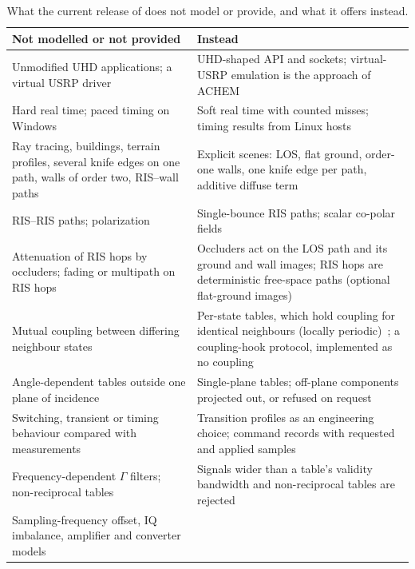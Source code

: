 \begin{table}[t]
\caption{What the current release of \sremu{} does not model or provide, and what it offers
instead.}
\label{tab:limitations}
\centering
\footnotesize
\setlength{\tabcolsep}{3pt}
\renewcommand{\arraystretch}{1.1}
\begin{tabular}{@{}>{\raggedright\arraybackslash}p{1.52in}>{\raggedright\arraybackslash}p{1.86in}@{}}
\toprule
Not modelled or not provided & Instead \\
\midrule
Unmodified UHD applications; a virtual USRP driver &
  UHD-shaped API and sockets; virtual-USRP emulation is the approach of
  ACHEM~\cite{Gurses2026ACHEM} \\
Hard real time; paced timing on Windows &
  Soft real time with counted misses; timing results from Linux hosts \\
Ray tracing, buildings, terrain profiles, several knife edges on one path, walls of order
  two, RIS--wall paths &
  Explicit scenes: LOS, flat ground, order-one walls, one knife edge per path, additive
  diffuse term \\
RIS--RIS paths; polarization & Single-bounce RIS paths; scalar co-polar fields \\
Attenuation of RIS hops by occluders; fading or multipath on RIS hops &
  Occluders act on the LOS path and its ground and wall images; RIS hops are deterministic
  free-space paths (optional flat-ground images) \\
Mutual coupling between differing neighbour states &
  Per-state tables, which hold coupling for identical neighbours (locally
  periodic)~\cite{ETSI_GR_RIS003_v121}; a coupling-hook protocol, implemented as no
  coupling \\
Angle-dependent tables outside one plane of incidence &
  Single-plane tables; off-plane components projected out, or refused on request \\
Switching, transient or timing behaviour compared with measurements &
  Transition profiles as an engineering choice; command records with requested and applied
  samples \\
Frequency-dependent $\Gamma$ filters; non-reciprocal tables &
  Signals wider than a table's validity bandwidth and non-reciprocal tables are rejected \\
Sampling-frequency offset, IQ imbalance, amplifier and converter models &

\end{tabular}
\end{table}

